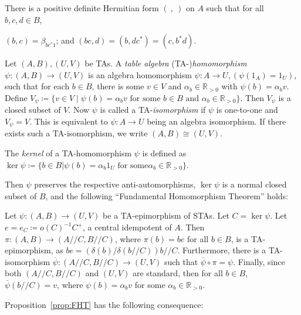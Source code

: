 \documentclass[ALCO,ThmDefs,Unicode,epreuves]{cedram}
\newcommand{\R}{{\mathbb R}}
\begin{document}
There is a positive definite Hermitian form $(\ ,\ )$ on $A$ such that
for
all $b,c,d \in B$,
\begin{center}
$(b,c) = \beta_{bc^*1}$; and
$(bc,d) = (b,dc^*) = (c,b^*d)$.
\end{center}

\begin{defi}
\label{def:TA-hom}
Let $(A, B), (U, V)$ be TAs. A \emph{table algebra} 
\textup{(}TA-\textup{)}\emph{homomorphism} 
$\psi: (A, B) \rightarrow (U, V)$ 
is an algebra homomorphism $\psi: A \rightarrow U, (\psi (1_A) = 1_U)$,
such that for each $b \in B$, there is some $v \in V$ and $\alpha_{b}
\in \R_{>0}$ with
$ \psi(b) = \alpha_{b}v$.
Define
$V_{\psi} \coloneqq \{ v \in V \mid \psi(b) = \alpha_bv \mbox{ for some }b \in
B \mbox{ and } \alpha_b \in \R_{>0}\}$. Then $V_{\psi}$ is a closed
subset of $V$. 
Now $\psi$ is called a TA-\emph{isomorphism} if $\psi$ is one-to-one
and $V_{\psi} = V$. This is equivalent to $\psi: A \rightarrow U$
being an algebra isomorphism. If there exists such a TA-isomorphism, 
we 
write $(A, B) \cong (U, V)$.
\end{defi}

\begin{defi}
\label{def:kernel}
The \emph{kernel} of a TA-homomorphism $\psi$ is defined as
$\ker \psi \coloneqq \{b \in B \vert \psi(b) = \alpha_b1_U \mbox{ for some
}\alpha_b \in \R_{>0}\}$.
\end{defi}

Then $\psi$ preserves the respective anti-automorphisms, $\ker \psi$ is a normal closed subset of $B$, and the
following ``Fundamental Homomorphism Theorem'' holds:
 

\begin{prop}
\label{prop:FHT}
Let $\psi : (A, B) \rightarrow (U, V)$ be a TA-epimorphism of STAs. Let
$C = \ker \psi$. Let $e = e_C \coloneqq o(C)^{-1}C^+$, a central
idempotent of $A$. Then $\pi : (A, B) \rightarrow (A//C, B//C)$, where
$\pi(b) = be$ for all $b \in B$, is a TA-epimorphism, as $be =
(\delta(b)/\delta(b//C))b//C$. Furthermore, there is a TA-isomorphism
$\overline{\psi} : (A//C, B//C) \rightarrow (U, V)$ such that
$\overline{\psi}\circ \pi = \psi$. Finally, since both $(A//C, B//C)$
and $(U, V)$ are standard, then for all $b \in B$,
$\overline{\psi}(b//C) = v$, where $\psi(b) = \alpha_bv$ for some
$\alpha_b \in {\R}_{>0}$. 
\end{prop} 


Proposition~\ref{prop:FHT} has the following consequence:
\end{document}
